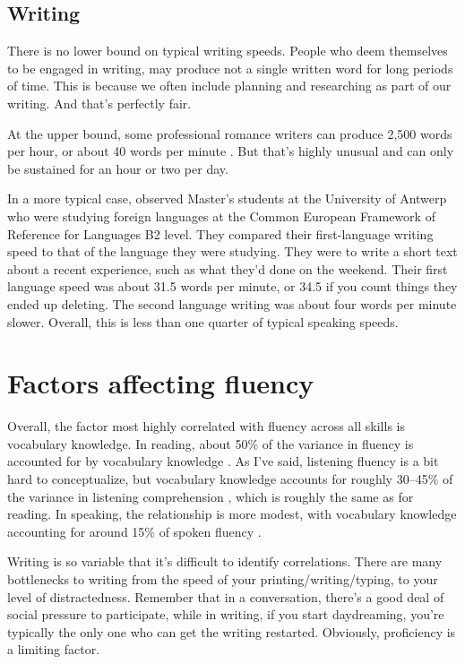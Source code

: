 \subsection{Writing}

There is no lower bound on typical writing speeds. People who deem themselves to be engaged in writing, may produce not a single written word for long periods of time. This is because we often include planning and researching as part of our writing. And that's perfectly fair.

At the upper bound, some professional romance writers can produce 2,500 words per hour, or about 40 words per minute \citep{Ha2017}. But that's highly unusual and can only be sustained for an hour or two per day.

In a more typical case, \citet{VanWaes2015} observed Master's students at the University of Antwerp who were studying foreign languages at the Common European Framework of Reference for Languages B2 level. They compared their first-language writing speed to that of the language they were studying. They were to write a short text about a recent experience, such as what they'd done on the weekend. Their first language speed was about 31.5 words per minute, or 34.5 if you count things they ended up deleting. The second language writing was about four words per minute slower. Overall, this is less than one quarter of typical speaking speeds.

\section{Factors affecting fluency}

Overall, the factor most highly correlated with fluency across all skills is vocabulary knowledge.  In reading, about 50\% of the variance in fluency is accounted for by vocabulary knowledge \citep{Grabe2010}. As I've said, listening fluency is a bit hard to conceptualize, but vocabulary knowledge accounts for roughly 30--45\% of the variance in listening comprehension \citep{Zhang2022a}, which is roughly the same as for reading. In speaking, the relationship is more modest, with vocabulary knowledge accounting for around 15\% of spoken fluency \citep{Uchihara2019a,Liu2020}.

Writing is so variable that it's difficult to identify correlations. There are many bottlenecks to writing from the speed of your printing/writing/typing, to your level of distractedness. Remember that in a conversation, there's a good deal of social pressure to participate, while in writing, if you start daydreaming, you're typically the only one who can get the writing restarted. Obviously, proficiency is a limiting factor.

